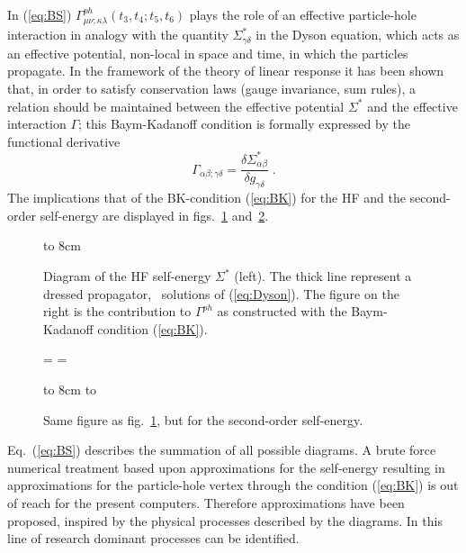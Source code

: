%
In (\ref{eq:BS}) $\Gamma^{ph}_{\mu\nu;\kappa\lambda}(t_3,t_4;t_5,t_6)$
plays the role of an effective particle-hole interaction in analogy with 
the quantity $\Sigma_{\gamma\delta}^\ast$ in the Dyson equation, 
which acts as an effective
potential, non-local in space and time, in which the particles propagate.
In the framework of the theory of linear response it has been shown 
that, in order to 
satisfy conservation laws (gauge invariance, sum rules), 
a relation should be maintained between 
the effective potential $\Sigma^\ast$ and the effective interaction $\Gamma$;
this Baym-Kadanoff condition\cite{BK61,Ba62} is formally expressed by the 
functional derivative
%
	\begin{equation}
		\Gamma_{\alpha\beta;\gamma\delta}
	=
		\frac{
			\delta \Sigma_{\alpha\beta}^\ast
		}{
			\delta g_{\gamma\delta}
		}
	\;.
	\label{eq:BK}
	\end{equation}
%
The implications that of the BK-condition (\ref{eq:BK}) for the HF and the
second-order self-energy are  displayed in figs.~\ref{fig:SGHF} 
and~\ref{fig:SG2nd}.
\begin{figure}
\centerline{
\hbox to 8cm{
\hfill
{}
}}
\caption[]{Diagram of the HF self-energy $\Sigma^\ast$ (left). 
The thick line represent a dressed propagator, \ie\ solutions of 
(\ref{eq:Dyson}). The figure on the right is the contribution
to $\Gamma^{ph}$ as constructed with the Baym-Kadanoff condition (\ref{eq:BK}).
\label{fig:SGHF}}
\end{figure}
\begin{figure}
%
%
=\vbox{
\hbox{}
\hbox{}
}
=
\centerline{
\hbox to 8cm{
\vbox to 
\hfill
\hbox{}
}}
\caption[]{Same figure as fig.~\ref{fig:SGHF}, but for the second-order 
self-energy.
\label{fig:SG2nd}}
\end{figure}
Eq.~(\ref{eq:BS}) describes the summation of all possible diagrams. A 
brute force numerical treatment based upon approximations for the self-energy
resulting in approximations for the particle-hole vertex through the 
condition (\ref{eq:BK})
is out of reach for the present computers. Therefore approximations have been 
proposed, inspired by the physical processes described by the diagrams.  In
this line of research dominant processes can be identified.

